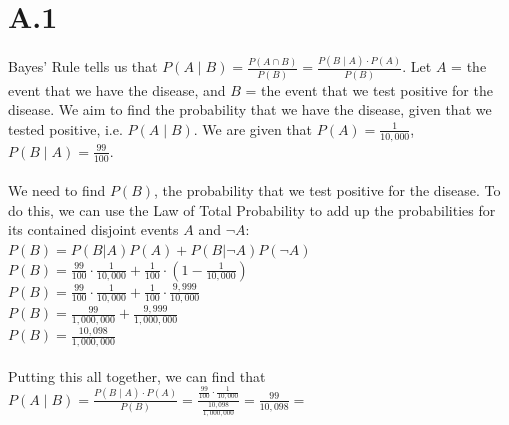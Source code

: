 \documentclass{article}
\date{{}}
\newcommand{\1}{\mathbf{1}}
\begin{document}
\thispagestyle{firstpageheader}

\section*{A.1}
{\Large 

Bayes' Rule tells us that $P(A \mid B) = \frac{P(A \cap B)}{P(B)} = \frac{P(B \mid A) \cdot P(A)}{P(B)}$. Let $A$ = the event that we have the disease, and $B$ = the event that we test positive for the disease. We aim to find the probability that we have the disease, given that we tested positive, i.e. $P(A \mid B)$. We are given that $P(A) = \frac{1}{10,000}$, $P(B \mid A) = \frac{99}{100}$. \\ \\ 
We need to find $P(B)$, the probability that we test positive for the disease. To do this, we can use the Law of Total Probability to add up the probabilities for its contained disjoint events $A$ and $\lnot A$: \\
$P(B) = P(B | A)P(A) + P(B | \lnot A)P(\lnot A)$ \\ 
$P(B) = \frac{99}{100} \cdot \frac{1}{10,000} + \frac{1}{100} \cdot (1 - \frac{1}{10,000})$ \\
$P(B) = \frac{99}{100} \cdot \frac{1}{10,000} + \frac{1}{100} \cdot \frac{9,999}{10,000}$ \\
$P(B) = \frac{99}{1,000,000} + \frac{9,999}{1,000,000}$ \\
$P(B) = \frac{10,098}{1,000,000}$ \\ \\
Putting this all together, we can find that \\
$P(A \mid B) = \frac{P(B \mid A) \cdot P(A)}{P(B)} = \frac{\frac{99}{100} \cdot \frac{1}{10,000}}{\frac{10,098}{1,000,000}} = \frac{99}{10,098} = $  \\ 


}
\end{document}

